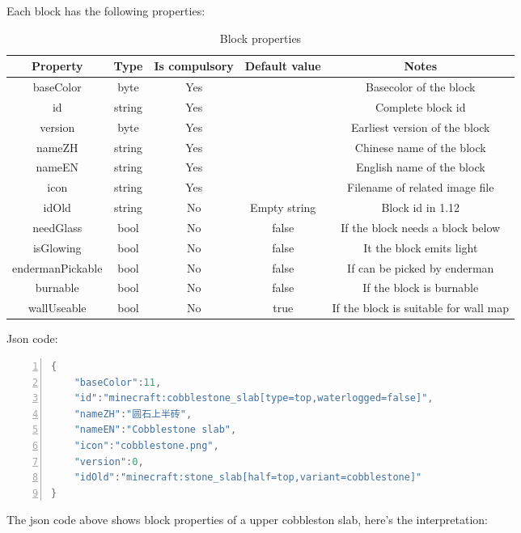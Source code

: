 \documentclass{article}
\begin{document}
   Each block has the following properties:
   \begin{table}[h]
    \centering
    \caption{Block properties}
    \begin{tabular}{ccccc}
        \hline
        Property & Type & Is compulsory & Default value & Notes  \\ \hline
        baseColor & byte & Yes & & Basecolor of the block \\
        id & string & Yes & & Complete block id\\
        version & byte & Yes & & Earliest version of the block \\
        nameZH & string & Yes & & Chinese name of the block \\
        nameEN & string & Yes & & English name of the block \\
        icon & string & Yes & & Filename of related image file \\
        idOld & string & No & Empty string & Block id in 1.12 \\
        needGlass & bool & No & false & If the block needs a block below \\
        isGlowing & bool & No & false & It the block emits light \\
        endermanPickable & bool & No & false & If can be picked by enderman \\
        burnable & bool & No & false & If the block is burnable \\
        wallUseable & bool & No & true & If the block is suitable for wall map \\
        \hline 
    \end{tabular}       
   \end{table}
   
   \clearpage
   Json code:
\begin{lstlisting}[language = C++, numbers=left, 
    numberstyle=\tiny,keywordstyle=\color{blue!70},
    commentstyle=\color{red!50!green!50!blue!50},frame=shadowbox,
    rulesepcolor=\color{red!20!green!20!blue!20},basicstyle=\ttfamily]
{
    "baseColor":11,
    "id":"minecraft:cobblestone_slab[type=top,waterlogged=false]",
    "nameZH":"圆石上半砖",
    "nameEN":"Cobblestone slab",
    "icon":"cobblestone.png",
    "version":0,
    "idOld":"minecraft:stone_slab[half=top,variant=cobblestone]"
}
    \end{lstlisting}
    The json code above shows block properties of a upper cobbleston slab, here's the interpretation:
\end{document}
